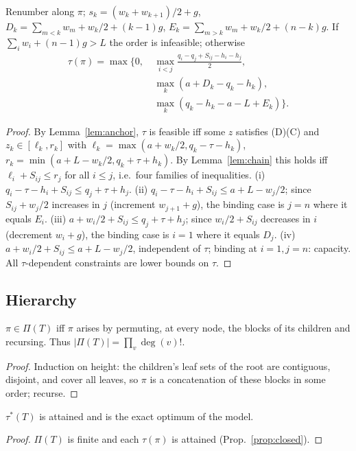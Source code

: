 \begin{proposition}\label{prop:closed}
Renumber along $\pi$; $s_k=(w_k+w_{k+1})/2+g$, $D_k=\sum_{m<k}w_m+w_k/2+(k-1)g$, $E_k=\sum_{m>k}w_m+w_k/2+(n-k)g$. If $\sum_iw_i+(n-1)g>L$ the order is infeasible; otherwise
\begin{align*}
\tau(\pi)=\max\Big\{0,\ &\max_{i<j}\tfrac{q_i-q_j+S_{ij}-h_i-h_j}{2},\\
&\max_k(a+D_k-q_k-h_k),\\
&\max_k(q_k-h_k-a-L+E_k)\Big\}.
\end{align*}
\end{proposition}
\begin{proof}By Lemma~\ref{lem:anchor}, $\tau$ is feasible iff some $z$ satisfies (D)(C) and $z_k\in[\ell_k,r_k]$ with $\ell_k=\max(a+w_k/2,q_k-\tau-h_k)$, $r_k=\min(a+L-w_k/2,q_k+\tau+h_k)$. By Lemma~\ref{lem:chain} this holds iff $\ell_i+S_{ij}\le r_j$ for all $i\le j$, i.e.\ four families of inequalities.
(i) $q_i-\tau-h_i+S_{ij}\le q_j+\tau+h_j$.
(ii) $q_i-\tau-h_i+S_{ij}\le a+L-w_j/2$; since $S_{ij}+w_j/2$ increases in $j$ (increment $w_{j+1}+g$), the binding case is $j=n$ where it equals $E_i$.
(iii) $a+w_i/2+S_{ij}\le q_j+\tau+h_j$; since $w_i/2+S_{ij}$ decreases in $i$ (decrement $w_i+g$), the binding case is $i=1$ where it equals $D_j$.
(iv) $a+w_i/2+S_{ij}\le a+L-w_j/2$, independent of $\tau$; binding at $i=1,j=n$: capacity.
All $\tau$-dependent constraints are lower bounds on $\tau$.\end{proof}

\subsection{Hierarchy}
\begin{lemma}\label{lem:orders}$\pi\in\Pi(T)$ iff $\pi$ arises by permuting, at every node, the blocks of its children and recursing. Thus $|\Pi(T)|=\prod_v\deg(v)!$.\end{lemma}
\begin{proof}Induction on height: the children's leaf sets of the root are contiguous, disjoint, and cover all leaves, so $\pi$ is a concatenation of these blocks in some order; recurse.\end{proof}

\begin{proposition}[Exactness]$\tau^*(T)$ is attained and is the exact optimum of the model.\end{proposition}
\begin{proof}$\Pi(T)$ is finite and each $\tau(\pi)$ is attained (Prop.~\ref{prop:closed}).\end{proof}

